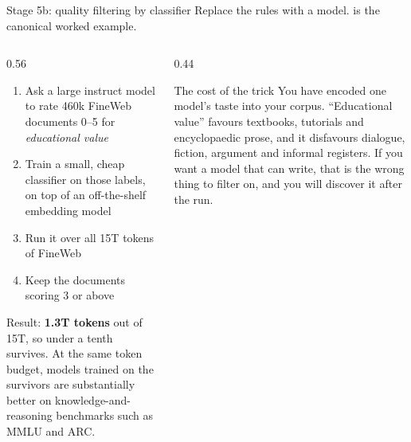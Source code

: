 \documentclass[aspectratio=169,10pt]{beamer}
\begin{document}
\begin{frame}{Stage 5b: quality filtering by classifier}
  Replace the rules with a model.  is the canonical worked
  example.
  \vspace{0.5em}
  \begin{columns}[T]
    \begin{column}{0.56\textwidth}
      \begin{enumerate}
        \item Ask a large instruct model to rate 460k FineWeb documents 0--5
          for \emph{educational value}
        \item Train a small, cheap classifier on those labels, on top of an
          off-the-shelf embedding model
        \item Run it over all 15T tokens of FineWeb
        \item Keep the documents scoring 3 or above
      \end{enumerate}
      \vspace{0.5em}
      Result: \textbf{1.3T tokens} out of 15T, so under a tenth survives. At
      the same token budget, models trained on the survivors are substantially
      better on knowledge-and-reasoning benchmarks such as MMLU and ARC.
    \end{column}
    \begin{column}{0.44\textwidth}
      \begin{block}{The cost of the trick}
        \small
        You have encoded one model's taste into your corpus.
        \vspace{0.4em}
        ``Educational value'' favours textbooks, tutorials and encyclopaedic
        prose, and it disfavours dialogue, fiction, argument and informal
        registers.
        \vspace{0.4em}
        If you want a model that can write, that is the wrong thing to filter
        on, and you will discover it after the run.
      \end{block}
    \end{column}
  \end{columns}
\end{frame}
\end{document}
